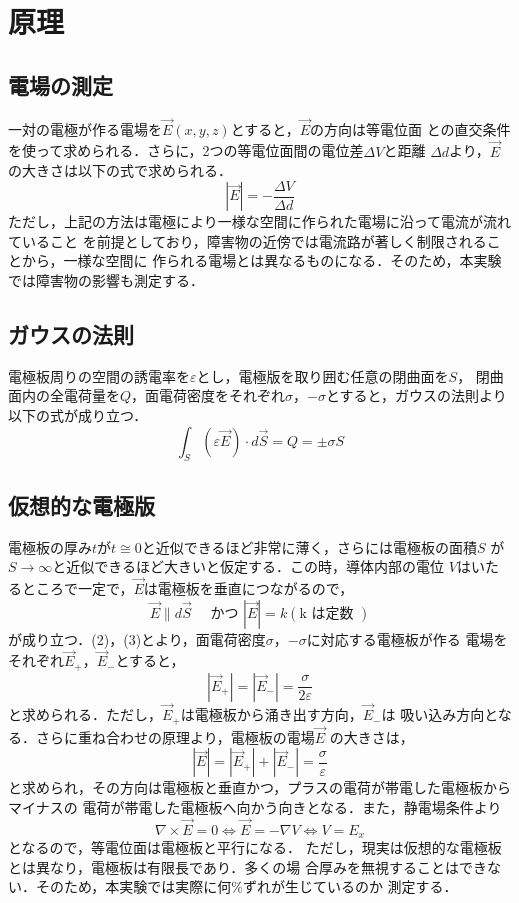 
\section{原理}

\subsection{電場の測定}
一対の電極が作る電場を$\vec{E}(x, y, z)$とすると，$\vec{E}$の方向は等電位面
との直交条件を使って求められる．さらに，2つの等電位面間の電位差$\Delta V$と距離
$\Delta d$より，$\vec{E}$の大きさは以下の式で求められる．
$$
|\vec{E}|=-\frac{\Delta V}{\Delta d}
$$
ただし，上記の方法は電極により一様な空間に作られた電場に沿って電流が流れていること
を前提としており，障害物の近傍では電流路が著しく制限されることから，一様な空間に
作られる電場とは異なるものになる．そのため，本実験では障害物の影響も測定する．

\subsection{ガウスの法則}
電極板周りの空間の誘電率を$\varepsilon$とし，電極版を取り囲む任意の閉曲面を$S$，
閉曲面内の全電荷量を$Q$，面電荷密度をそれぞれ$\sigma$，$-\sigma$とすると，ガウスの法則より以下の式が成り立つ．
$$
\int_S(\varepsilon \vec{E}) \cdot d \vec{S}=Q=\pm \sigma S
$$

\subsection{仮想的な電極版}
電極板の厚み$t$が$t\cong 0$と近似できるほど非常に薄く，さらには電極板の面積$S$
が$S \rightarrow \infty$と近似できるほど大きいと仮定する．この時，導体内部の電位
$V$はいたるところで一定で，$\vec{E}$は電極板を垂直につながるので，
$$
\vec{E} \| d \vec{S} \quad \text { かつ }|\vec{E}|=k(\mathrm{k} \text { は定数 })
$$
が成り立つ．(2)，(3)とより，面電荷密度$\sigma$，$-\sigma$に対応する電極板が作る
電場をそれぞれ$\vec{E}_{+}$，$\vec{E}_{-}$とすると，
$$
\left|\vec{E}_{+}\right|=\left|\vec{E}_{-}\right|=\frac{\sigma}{2 \varepsilon}
$$
と求められる．ただし，$\vec{E}_{+}$は電極板から涌き出す方向，$\vec{E}_{-}$は
吸い込み方向となる．さらに重ね合わせの原理より，電極板の電場$\vec{E}$ の大きさは，
$$
|\vec{E}|=\left|\vec{E}_{+}\right|+\left|\vec{E}_{-}\right|=\frac{\sigma}{\varepsilon}
$$
と求められ，その方向は電極板と垂直かつ，プラスの電荷が帯電した電極板からマイナスの
電荷が帯電した電極板へ向かう向きとなる．また，静電場条件より
$$
\nabla \times \vec{E}=0 \Leftrightarrow \vec{E}=-\nabla V \Leftrightarrow V=E_x
$$
となるので，等電位面は電極板と平行になる．
ただし，現実は仮想的な電極板とは異なり，電極板は有限長であり．多くの場
合厚みを無視することはできない．そのため，本実験では実際に何\%ずれが生じているのか
測定する．